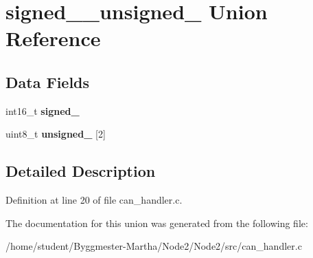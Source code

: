 \hypertarget{unionsigned__16__unsigned__8}{}\section{signed\+\_\+\_\+unsigned\+\_ Union Reference}
\label{unionsigned__16__unsigned__8}
\subsection*{Data Fields}
\begin{DoxyCompactItemize}
\item 
\mbox{\label{unionsigned__16__unsigned__8_ae0f653c9792eb38b422c7902fb29ca38}} 
int16\+\_\+t {\bfseries signed\+\_}
\item 
\mbox{\label{unionsigned__16__unsigned__8_a5565871afadcc4dbfded539cbf4362fd}} 
uint8\+\_\+t {\bfseries unsigned\+\_} \mbox{[}2\mbox{]}
\end{DoxyCompactItemize}


\subsection{Detailed Description}


Definition at line 20 of file can\+\_\+handler.\+c.



The documentation for this union was generated from the following file\+:\begin{DoxyCompactItemize}
\item 
/home/student/\+Byggmester-\/\+Martha/\+Node2/\+Node2/src/can\+\_\+handler.\+c\end{DoxyCompactItemize}
